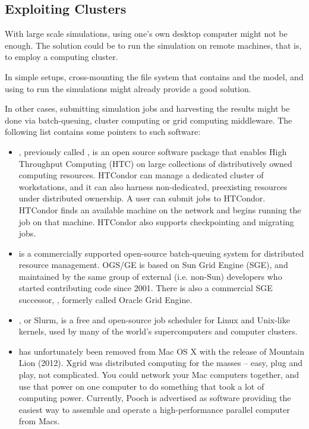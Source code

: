 \subsection{Exploiting Clusters}
\label{sec:run-sim:opp-runall:exploiting-clusters}

With large scale simulations, using one's own desktop computer might not be
enough. The solution could be to run the simulation on remote machines,
that is, to employ a computing cluster.

In simple setups, cross-mounting the file system that contains {\opp} and the
model, and using  to run the simulations might already provide a good
solution. 

In other cases, submitting simulation jobs and harvesting the results might be
done via batch-queuing, cluster computing or grid computing middleware. The
following list contains some pointers to such software:
 
\begin{itemize}

  \item {}, previously called , is an open source
      software package that enables High Throughput Computing (HTC) 
      on large collections of distributively owned computing resources.
      HTCondor can manage a dedicated cluster of workstations, and it can also
      harness non-dedicated, preexisting resources under distributed ownership.
      A user can submit jobs to HTCondor. HTCondor finds an available machine 
      on the network and begins running the job on that machine. HTCondor also
      supports checkpointing and migrating jobs. 

\item {} is a commercially supported
      open-source batch-queuing system for distributed resource management.
      OGS/GE is based on Sun Grid Engine (SGE), and maintained by the same group
      of external (i.e. non-Sun) developers who started contributing code since
      2001. There is also a commercial SGE successor, ,
      formerly called Oracle Grid Engine.

\item {}, or Slurm, is a free and open-source job
      scheduler for Linux and Unix-like kernels, used by many of the world's
      supercomputers and computer clusters.

\item {} has unfortunately been removed from Mac OS X with the
     release of Mountain Lion (2012). Xgrid was distributed computing for
     the masses -- easy, plug and play, not complicated. You could network your
     Mac computers together, and use that power on one computer to do something
     that took a lot of computing power. Currently, Pooch is advertised
     as software providing the easiest way to assemble and operate a
     high-performance parallel computer from Macs.
 
\end{itemize}



